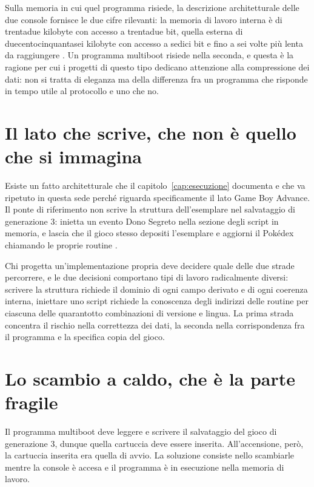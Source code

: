 Sulla memoria in cui quel programma risiede, la descrizione architetturale delle due console fornisce le due cifre rilevanti: la memoria di lavoro interna è di trentadue kilobyte con accesso a trentadue bit, quella esterna di duecentocinquantasei kilobyte con accesso a sedici bit e fino a sei volte più lenta da raggiungere \cite{copetti}. Un programma multiboot risiede nella seconda, e questa è la ragione per cui i progetti di questo tipo dedicano attenzione alla compressione dei dati: non si tratta di eleganza ma della differenza fra un programma che risponde in tempo utile al protocollo e uno che no.

\section{Il lato che scrive, che non è quello che si immagina}

Esiste un fatto architetturale che il capitolo~\ref{cap:esecuzione} documenta e che va ripetuto in questa sede perché riguarda specificamente il lato Game Boy Advance. Il ponte di riferimento non scrive la struttura dell'esemplare nel salvataggio di generazione 3: inietta un evento Dono Segreto nella sezione degli script in memoria, e lascia che il gioco stesso depositi l'esemplare e aggiorni il Pokédex chiamando le proprie routine \cite{devlog-ptgb}.

Chi progetta un'implementazione propria deve decidere quale delle due strade percorrere, e le due decisioni comportano tipi di lavoro radicalmente diversi: scrivere la struttura richiede il dominio di ogni campo derivato e di ogni coerenza interna, iniettare uno script richiede la conoscenza degli indirizzi delle routine per ciascuna delle quarantotto combinazioni di versione e lingua. La prima strada concentra il rischio nella correttezza dei dati, la seconda nella corrispondenza fra il programma e la specifica copia del gioco.

\section{Lo scambio a caldo, che è la parte fragile}

Il programma multiboot deve leggere e scrivere il salvataggio del gioco di generazione 3, dunque quella cartuccia deve essere inserita. All'accensione, però, la cartuccia inserita era quella di avvio. La soluzione consiste nello scambiarle mentre la console è accesa e il programma è in esecuzione nella memoria di lavoro.

